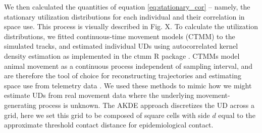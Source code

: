 ﻿\documentclass[11pt]{article}
\begin{document}
We then calculated the quantities of equation \ref{eq:stationary_cor} -- namely, the stationary utilization distributions for each individual and their correlation in space use.  This process is visually described in Fig. X. To calculate the utilization distributions, we fitted continuous-time movement models (CTMM) to the simulated tracks, and estimated individual UDs using autocorrelated kernel density estimation as implemented in the ctmm R package \citep[AKDE, ][]{Fleming2014, Calabrese2016,Fleming2022}. CTMMs model animal movement as a continuous process independent of sampling interval, and are therefore the tool of choice for reconstructing trajectories and estimating space use from telemetry data \citep{Fleming2014}. We used these methods to mimic how we might estimate UDs from real movement data where the underlying movement-generating process is unknown. The AKDE approach discretizes the UD across a grid, here we set this grid to be composed of square cells with side $d$ equal to the approximate threshold contact distance for epidemiological contact. %
\end{document}
